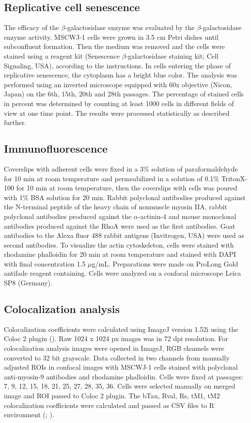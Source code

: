 \documentclass[alpha-refs]{wiley-article}
\begin{document}
\subsection{Replicative cell senescence}

The efficacy of the $\beta$-galactosidase enzyme was evaluated by the $\beta$-galactosidase enzyme activity.
MSCWJ-1 cells were grown in 3.5 cm Petri dishes until subconfluent formation.
Then the medium was removed and the cells were stained using a reagent kit (Senescence $\beta$-galactosidase staining kit; Cell Signaling, USA), according to the instructions.
In cells entering the phase of replicative senescence, the cytoplasm has a bright blue color.
The analysis was performed using an inverted microscope equipped with 60x objective (Nicon, Japan) on the 6th, 15th, 20th and 28th passages.
The percentage of stained cells in percent was determined by counting at least 1000 cells in different fields of view at one time point.
The results were processed statistically as described further.

\subsection{Immunofluorescence}

Coverslips with adherent cells were fixed in a 3\% solution of paraformaldehyde for 10 min at room temperature and permeabilized in a solution of 0.1\% TritonX-100 for 10 min at room temperature, then the coverslips with cells was poured with 1\% BSA solution for 20 min.
Rabbit polyclonal antibodies produced against the N-terminal peptide of the heavy chain of nonmuscle myosin IIA, rabbit polyclonal antibodies produced against the $\alpha$-actinin-4 and mouse monoclonal antibodies produced against the RhoA were used as the first antibodies.
Goat antibodies to the Alexa fluor 488 rabbit antigens (Invitrogen, USA) were used as second antibodies.
To visualize the actin cytoskeleton, cells were stained with rhodamine phalloidin for 20 min at room temperature and stained with DAPI with final concentration 1.5 $\mu$g/mL.
Preparations were made on ProLong Gold antifade reagent containing.
Cells were analyzed on a confocal microscope Leica SP8 (Germany).


\subsection{Colocalization analysis}

Colocalization coefficients were calculated using ImageJ version 1.52i using the Coloc 2 plugin (\cite{rueden2017imagej2}).
Raw 1024 x 1024 px images was in 72 dpi resolution.
For colocalization analysis images were opened in ImageJ, RGB channels were converted to 32 bit grayscale.
Data collected in two channels from manually adjusted ROIs in confocal images with MSCWJ-1 cells stained with polyclonal anti-myosin-9 antibodies and rhodamine phalloidin. Cells were fixed at passages: 7, 9, 12, 15, 18, 21, 25, 27, 28, 35, 36.
Cells were selected manually on merged image and ROI passed to Coloc 2 plugin.
The bTau, Rval, Rs, tM1, tM2 colocalization coefficients were calculated and passed as CSV files to R environment (\cite{adler2008replicate}; \cite{bergholm2010analysis}).
\end{document}
